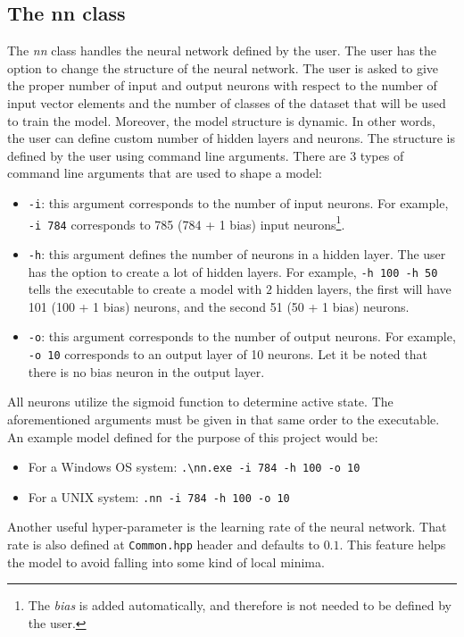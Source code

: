 \subsection{The nn class}
\label{nn}
The \emph{nn} class handles the neural network defined by the user. The user has the option to change the structure of the neural network. The user is asked to give the proper number of input and output neurons with respect to the number of input vector elements and the number of classes of the dataset that will be used to train the model. Moreover, the model structure is dynamic. In other words, the user can define custom number of hidden layers and neurons. The structure is defined by the user using command line arguments. There are 3 types of command line arguments that are used to shape a model:
\begin{itemize}
\item \verb|-i|: this argument corresponds to the number of input neurons. For example, \verb|-i 784| corresponds to 785 (784 + 1 bias) input neurons\footnote{The \emph{bias} is added automatically, and therefore is not needed to be defined by the user.}.
\item \verb|-h|: this argument defines the number of neurons in a hidden layer. The user has the option to create a lot of hidden layers. For example, \verb|-h 100 -h 50| tells the executable to create a model with $2$ hidden layers, the first will have 101 (100 + 1 bias) neurons, and the second 51 (50 + 1  bias) neurons.
\item \verb|-o|: this argument corresponds to the number of output neurons. For example, \verb|-o 10| corresponds to an output layer of 10 neurons. Let it be noted that there is no bias neuron in the output layer.
\end{itemize}

All neurons utilize the sigmoid function to determine active state. The aforementioned arguments must be given in that same order to the executable. An example model defined for the purpose of this project would be:
\begin{itemize}
\item For a Windows OS system: \verb|.\nn.exe -i 784 -h 100 -o 10|
\item For a UNIX system: \verb|.nn -i 784 -h 100 -o 10|
\end{itemize}

Another useful hyper-parameter is the learning rate of the neural network. That rate is also defined at \verb|Common.hpp| header and defaults to $0.1$. This feature helps the model to avoid falling into some kind of local minima.

